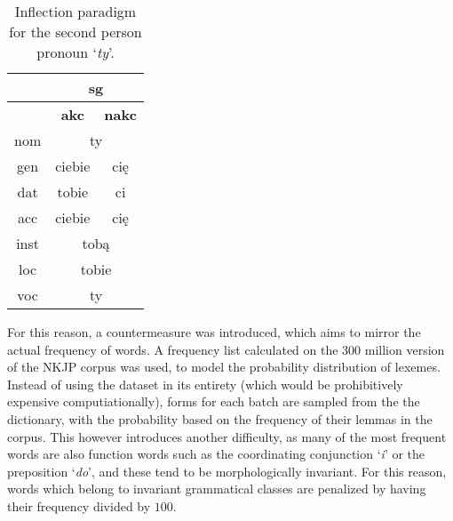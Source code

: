 \documentclass[12pt]{article}
\newcommand{\inlinegloss}[1]{`\textit{#1}'}
\begin{document}
\begin{table}[H]
\centering
\begin{tabular}{c|c|c}
& \multicolumn{2}{c}{\textbf{sg}}\\
\hline
&  \textbf{akc} & \textbf{nakc}   \\
\hline
nom & \multicolumn{2}{c}{ty}\\
\hline
gen &  ciebie &  cię   \\
\hline
dat &  tobie &  ci  \\
\hline
acc &  ciebie & cię  \\
\hline
inst &  \multicolumn{2}{c}{tobą}   \\
\hline
loc &  \multicolumn{2}{c}{tobie}   \\
\hline
voc &  \multicolumn{2}{c}{ty}  \\
\end{tabular}
\caption{Inflection paradigm for the second person pronoun \inlinegloss{ty}.}
\label{tab:pronoun}
\end{table}

For this reason, a countermeasure was introduced, which aims to mirror the actual frequency of words. A frequency list calculated on the 300 million version of the NKJP corpus was used, to model the probability distribution of lexemes. Instead of using the dataset in its entirety (which would be prohibitively expensive computiationally), forms for each batch are sampled from the the dictionary, with the probability based on the frequency of their lemmas in the corpus. This however introduces another difficulty, as many of the most frequent words are also function words such as the coordinating conjunction \inlinegloss{i} or the preposition \inlinegloss{do}, and these tend to be morphologically invariant. For this reason, words which belong to invariant grammatical classes are penalized by having their frequency divided by $100$.
\end{document}
